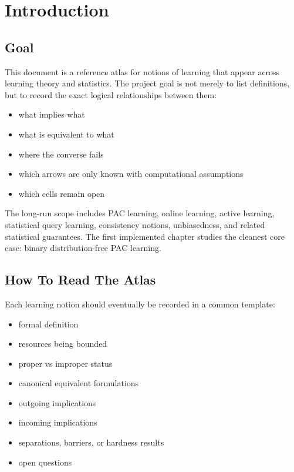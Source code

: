 \chapter{Introduction}

\section{Goal}

This document is a reference atlas for notions of learning that appear across learning theory and statistics. The project goal is not merely to list definitions, but to record the exact logical relationships between them:

\begin{itemize}
\item what implies what
\item what is equivalent to what
\item where the converse fails
\item which arrows are only known with computational assumptions
\item which cells remain open
\end{itemize}

The long-run scope includes PAC learning, online learning, active learning, statistical query learning, consistency notions, unbiasedness, and related statistical guarantees. The first implemented chapter studies the cleanest core case: binary distribution-free PAC learning.

\section{How To Read The Atlas}

Each learning notion should eventually be recorded in a common template:

\begin{itemize}
\item formal definition
\item resources being bounded
\item proper vs improper status
\item canonical equivalent formulations
\item outgoing implications
\item incoming implications
\item separations, barriers, or hardness results
\item open questions
\end{itemize}

